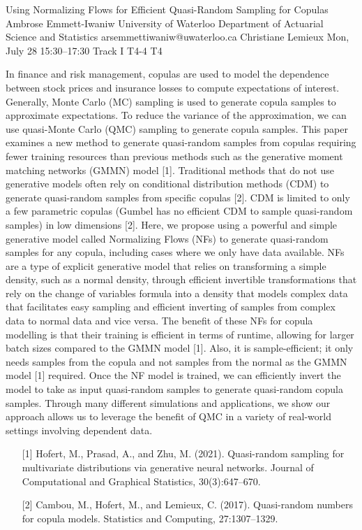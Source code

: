 \begin{talk}
  {Using Normalizing Flows for Efficient Quasi-Random Sampling for Copulas}%
  {Ambrose Emmett-Iwaniw}%
  {University of Waterloo Department of Actuarial Science and Statistics}%
  {arsemmettiwaniw@uwaterloo.ca}%
  {Christiane Lemieux}%
  {}%
  {Mon, July 28 15:30–17:30 Track I}%
  {T4-4}%
  {T4}%
			
In finance and risk management, copulas are used to model the dependence between stock prices and insurance losses to compute expectations of interest. Generally, Monte Carlo (MC) sampling is used to generate copula samples to approximate expectations. To reduce the variance of the approximation, we can use quasi-Monte Carlo (QMC) sampling to generate copula samples. This paper examines a new method to generate quasi-random samples from copulas requiring fewer training resources than previous methods such as the generative moment matching networks (GMMN) model [1]. Traditional methods that do not use generative models often rely on conditional distribution methods (CDM) to generate quasi-random samples from specific copulas [2]. CDM is limited to only a few parametric copulas (Gumbel has no efficient CDM to sample quasi-random samples) in low dimensions [2]. Here, we propose using a powerful and simple generative model called Normalizing Flows (NFs) to generate quasi-random samples for any copula, including cases where we only have data available. NFs are a type of explicit generative model that relies on transforming a simple density, such as a normal density, through efficient invertible transformations that rely on the change of variables formula into a density that models complex data that facilitates easy sampling and efficient inverting of samples from complex data to normal data and vice versa. The benefit of these NFs for copula modelling is that their training is efficient in terms of runtime, allowing for larger batch sizes compared to the GMMN model [1]. Also, it is sample-efficient; it only needs samples from the copula and not samples from the normal as the GMMN model [1] required. Once the NF model is trained, we can efficiently invert the model to take as input quasi-random samples to generate quasi-random copula samples. Through many different simulations and applications, we show our approach allows us to leverage the benefit of QMC in a variety of real-world settings involving dependent data.
\medskip

\begin{enumerate}
	\item[{[1]}] Hofert, M., Prasad, A., and Zhu, M. (2021). Quasi-random sampling for multivariate distributions via generative neural networks. Journal of Computational and Graphical Statistics,
30(3):647–670.
	\item[{[2]}] Cambou, M., Hofert, M., and Lemieux, C. (2017). Quasi-random numbers for copula models. Statistics and Computing, 27:1307–1329. 
\end{enumerate}
\end{talk}
